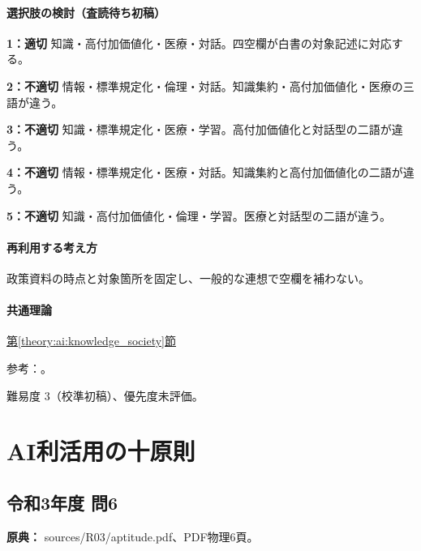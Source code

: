 \paragraph{選択肢の検討（査読待ち初稿）}\mbox{}\par

\noindent\textbf{1：適切} 知識・高付加価値化・医療・対話。四空欄が白書の対象記述に対応する。\par

\noindent\textbf{2：不適切} 情報・標準規定化・倫理・対話。知識集約・高付加価値化・医療の三語が違う。\par

\noindent\textbf{3：不適切} 知識・標準規定化・医療・学習。高付加価値化と対話型の二語が違う。\par

\noindent\textbf{4：不適切} 情報・標準規定化・医療・対話。知識集約と高付加価値化の二語が違う。\par

\noindent\textbf{5：不適切} 知識・高付加価値化・倫理・学習。医療と対話型の二語が違う。\par

\paragraph{再利用する考え方} 政策資料の時点と対象箇所を固定し、一般的な連想で空欄を補わない。

\paragraph{共通理論} \hyperref[theory:ai:knowledge_society]{第\ref*{theory:ai:knowledge_society}節}

\par 参考：\cite{mext_ai_whitepaper2024}。

\par 難易度 3（校準初稿）、優先度未評価。

\section{AI利活用の十原則}

\subsection{令和3年度 問6}
\label{q:r03-reg-apt-06}

\noindent\textbf{原典：} sources/R03/aptitude.pdf、PDF物理6頁。

